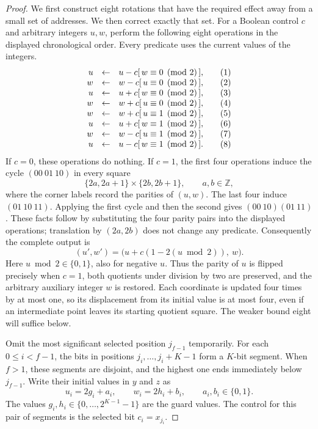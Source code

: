 \documentclass[11pt]{article}
\theoremstyle{definition}
\begin{document}
\begin{proof}
We first construct eight rotations that have the required effect away
from a small set of addresses. We then correct exactly that set.
For a Boolean control $c$ and arbitrary integers $u,w$, perform the following
eight operations in the displayed chronological order. Every predicate
uses the current values of the integers.
\begin{equation}
\label{eq:eight-packed-additions}
\begin{array}{rcl@{\qquad}l}
u&\leftarrow&u-c[\,w\equiv0\pmod2\,],&(1)\\
w&\leftarrow&w-c[\,u\equiv0\pmod2\,],&(2)\\
u&\leftarrow&u+c[\,w\equiv0\pmod2\,],&(3)\\
w&\leftarrow&w+c[\,u\equiv0\pmod2\,],&(4)\\
w&\leftarrow&w+c[\,u\equiv1\pmod2\,],&(5)\\
u&\leftarrow&u+c[\,w\equiv1\pmod2\,],&(6)\\
w&\leftarrow&w-c[\,u\equiv1\pmod2\,],&(7)\\
u&\leftarrow&u-c[\,w\equiv1\pmod2\,].&(8)
\end{array}
\end{equation}
If $c=0$, these operations do nothing. If $c=1$, the first four operations
induce the cycle $(00\ 01\ 10)$ in every square
\[
 \{2a,2a+1\}\times\{2b,2b+1\},\qquad a,b\in\mathbb Z,
\]
where the corner labels record the parities of $(u,w)$. The last four
induce $(01\ 10\ 11)$. Applying the first cycle and then the second gives
$(00\ 10)(01\ 11)$. These facts follow by substituting the four parity
pairs into the displayed operations; translation by $(2a,2b)$ does not
change any predicate. Consequently the complete output is
\begin{equation}
\label{eq:eight-packed-result}
 (u',w')=
 \bigl(u+c(1-2(u\bmod2)),\ w\bigr).
\end{equation}
Here $u\bmod2\in\{0,1\}$, also for negative $u$. Thus the parity of $u$
is flipped precisely when $c=1$, both quotients under division by two are
preserved, and the arbitrary auxiliary integer $w$ is restored. Each
coordinate is updated four times by at most one, so its displacement
from its initial value is at most four, even if an intermediate point
leaves its starting quotient square. The weaker bound eight will suffice below.

Omit the most significant selected position $j_{f-1}$ temporarily. For
each $0\le i<f-1$, the bits in positions
$j_i,\ldots,j_i+K-1$ form a $K$-bit segment. When $f>1$, these segments
are disjoint, and the highest one ends immediately below $j_{f-1}$.
Write their initial values in $y$ and $z$ as
\[
 u_i=2g_i+a_i,\qquad w_i=2h_i+b_i,
 \qquad a_i,b_i\in\{0,1\}.
\]
The values $g_i,h_i\in\{0,\ldots,2^{K-1}-1\}$ are the guard values. The
control for this pair of segments is the selected bit $c_i=x_{j_i}$.


\end{proof}
\end{document}
